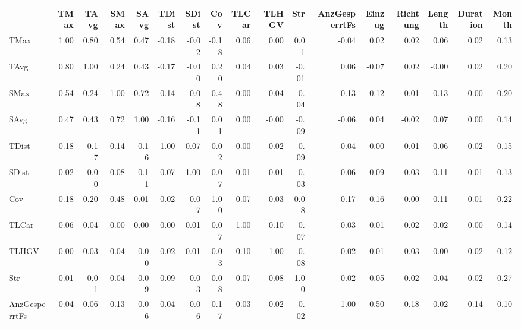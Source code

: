 \begin{tabular}{lrrrrrrrrrrrrrrrr}
\toprule
{} &  TMax &  TAvg &  SMax &  SAvg &  TDist &  SDist &   Cov &  TLCar &  TLHGV &   Str &  AnzGesperrtFs &  Einzug &  Richtung &  Length &  Duration &  Month \\
\midrule
TMax          &  1.00 &  0.80 &  0.54 &  0.47 &  -0.18 &  -0.02 & -0.18 &   0.06 &   0.00 &  0.01 &          -0.04 &    0.02 &      0.02 &    0.06 &      0.02 &   0.13 \\
TAvg          &  0.80 &  1.00 &  0.24 &  0.43 &  -0.17 &  -0.00 &  0.20 &   0.04 &   0.03 & -0.01 &           0.06 &   -0.07 &      0.02 &   -0.00 &      0.02 &   0.20 \\
SMax          &  0.54 &  0.24 &  1.00 &  0.72 &  -0.14 &  -0.08 & -0.48 &   0.00 &  -0.04 & -0.04 &          -0.13 &    0.12 &     -0.01 &    0.13 &      0.00 &   0.20 \\
SAvg          &  0.47 &  0.43 &  0.72 &  1.00 &  -0.16 &  -0.11 &  0.01 &   0.00 &  -0.00 & -0.09 &          -0.06 &    0.04 &     -0.02 &    0.07 &      0.00 &   0.14 \\
TDist         & -0.18 & -0.17 & -0.14 & -0.16 &   1.00 &   0.07 & -0.02 &   0.00 &   0.02 & -0.09 &          -0.04 &    0.00 &      0.01 &   -0.06 &     -0.02 &   0.15 \\
SDist         & -0.02 & -0.00 & -0.08 & -0.11 &   0.07 &   1.00 & -0.07 &   0.01 &   0.01 & -0.03 &          -0.06 &    0.09 &      0.03 &   -0.11 &     -0.01 &   0.13 \\
Cov           & -0.18 &  0.20 & -0.48 &  0.01 &  -0.02 &  -0.07 &  1.00 &  -0.07 &  -0.03 &  0.08 &           0.17 &   -0.16 &     -0.00 &   -0.11 &     -0.01 &   0.22 \\
TLCar         &  0.06 &  0.04 &  0.00 &  0.00 &   0.00 &   0.01 & -0.07 &   1.00 &   0.10 & -0.07 &          -0.03 &    0.01 &     -0.02 &    0.02 &      0.00 &   0.14 \\
TLHGV         &  0.00 &  0.03 & -0.04 & -0.00 &   0.02 &   0.01 & -0.03 &   0.10 &   1.00 & -0.08 &          -0.02 &    0.01 &      0.03 &    0.00 &      0.02 &   0.12 \\
Str           &  0.01 & -0.01 & -0.04 & -0.09 &  -0.09 &  -0.03 &  0.08 &  -0.07 &  -0.08 &  1.00 &          -0.02 &    0.05 &     -0.02 &   -0.04 &     -0.02 &   0.27 \\
AnzGesperrtFs & -0.04 &  0.06 & -0.13 & -0.06 &  -0.04 &  -0.06 &  0.17 &  -0.03 &  -0.02 & -0.02 &           1.00 &    0.50 &      0.18 &   -0.02 &      0.14 &   0.10 \\

\end{tabular}
